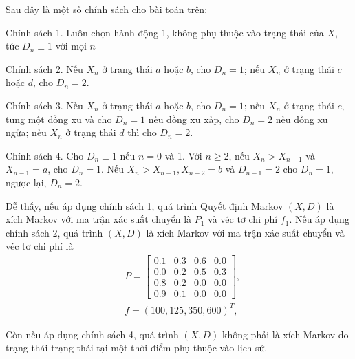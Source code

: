 \documentclass[12pt,a4paper]{report}
\begin{document}
	 \medskip
	 Sau đây là một số chính sách cho bài toán trên:
	 
	 \medskip
	 \noindent	
	 	Chính sách 1. Luôn chọn hành động 1, không phụ thuộc vào trạng thái của $X$, tức $D_n \equiv 1$ với mọi $n$
    
    \medskip
    \noindent
     Chính sách 2. Nếu $X_n$ ở trạng thái $a$ hoặc $b$, cho $D_n=1$; nếu $X_n$ ở trạng thái $c$ hoặc $d$, cho $D_n=2$.
    
     \medskip
     \noindent
     Chính sách 3. Nếu $X_n$ ở trạng thái $a$ hoặc $b$, cho $D_n=1$; nếu $X_n$ ở trạng thái $c$, tung một đồng xu và cho $D_n=1$ nếu đồng xu xấp, cho $D_n=2$ nếu đồng xu ngửa; nếu $X_n$ ở trạng thái $d$ thì cho $D_n=2$.
     
     \medskip
     \noindent
     Chính sách 4. Cho $D_n\equiv1$ nếu $n=0$ và 1. Với $n \geq 2$, nếu $X_{n}>X_{n-1}$ và $X_{n-1}=a$, cho $D_n=1$. Nếu $X_n>X_{n-1}, X_{n-2}=b$ và $D_{n-1}=2$ cho $D_n=1$, ngược lại, $D_n=2$.
     
     \medskip
   
     Dễ thấy, nếu áp dụng chính sách 1, quá trình Quyết định Markov $(X,D)$ là xích Markov với ma trận xác suất chuyển là $P_1$ và véc tơ chi phí $f_1$. Nếu áp dụng chính sách 2, quá trình $(X,D)$ là xích Markov với ma trận xác suất chuyển và véc tơ chi phí là 
     \begin{align*}
     &P=\left[
     \begin{array}{cccc}
     0.1&0.3&0.6&0.0\\
     0.0&0.2&0.5&0.3\\
      0.8&0.2&0.0&0.0\\
    0.9&0.1&0.0&0.0
     \end{array}
     \right],\\
    &f=(100,125,350,600)^T,
     \end{align*}
      
   
     \noindent
     Còn nếu áp dụng chính sách 4, quá trình $(X,D)$ không phải là xích Markov do trạng thái trạng thái tại một thời điểm phụ thuộc vào lịch sử.
     
\end{document}
